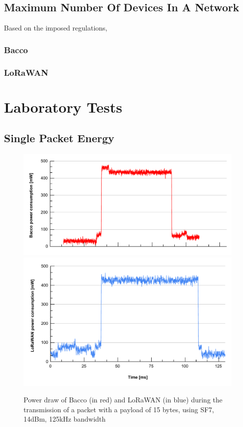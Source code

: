 \subsection{Maximum Number Of Devices In A Network}
Based on the imposed regulations, 

\subsubsection{Bacco}

\subsubsection{LoRaWAN}


\section{Laboratory Tests}

\subsection{Single Packet Energy}

\begin{figure}[ht]
    \centering
    \includegraphics[width=1.0\textwidth]{images/bacco_SF7_14dbm_125khz_power.pdf}\\
    \vspace{-0.7cm}
    \includegraphics[width=1.0\textwidth]{images/lorawan_SF7_14dbm_125khz_power.pdf}
    \caption{Power draw of Bacco (in red) and LoRaWAN (in blue) during the transmission of a packet with a payload of 15
    bytes, using SF7, 14dBm, 125kHz bandwidth}
    \label{bacco SF7}
\end{figure}

